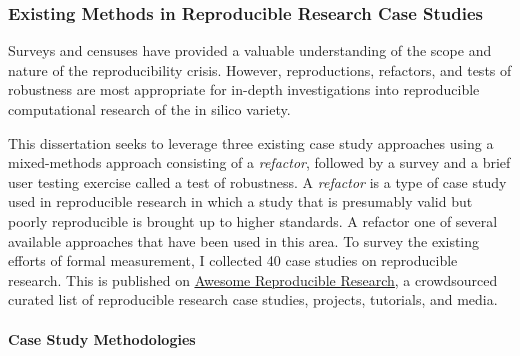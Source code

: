 \documentclass{drexelthesis}
\begin{document}
\subsubsection{Existing Methods in Reproducible Research Case Studies}

Surveys and censuses have provided a valuable understanding of the scope and nature of the reproducibility crisis. However, reproductions, refactors, and tests of robustness are most appropriate for in-depth investigations into reproducible computational research of the in silico variety. 

This dissertation seeks to leverage three existing case study approaches using a mixed-methods approach consisting of a \textit{refactor}, followed by a survey and a brief user testing exercise called a test of robustness. A \textit{refactor} is a type of case study used in reproducible research in which a study that is presumably valid but poorly reproducible is brought up to higher standards. A refactor one of several available approaches that have been used in this area. To survey the existing efforts of formal measurement, I collected 40 case studies on reproducible research. This is published on \href{https://github.com/leipzig/awesome-reproducible-research}{\uline{Awesome Reproducible Research}}, a crowdsourced curated list of reproducible research case studies, projects, tutorials, and media.

\newpage

\paragraph{Case Study Methodologies}
\end{document}
